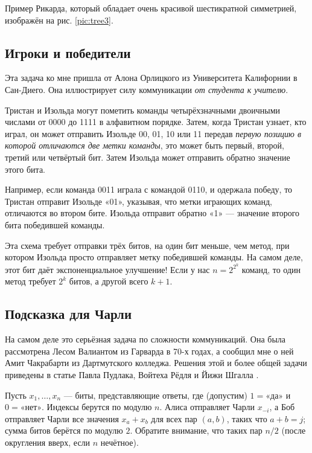 Пример Рикарда, который обладает очень красивой шестикратной симметрией, изображён на рис. \ref{pic:tree3}.

\subsection*{Игроки и победители}

Эта задача ко мне пришла от Алона Орлицкого из Университета Калифорнии в Сан-Диего.
Она иллюстрирует силу коммуникации \emph{от студента к учителю}.

Тристан и Изольда могут пометить команды четырёхзначными двоичными числами от 0000 до 1111 в алфавитном порядке. Затем, когда Тристан узнает, кто играл, он может отправить Изольде 00, 01, 10 или 11 передав \emph{первую позицию в которой отличаются две метки команды}, это может быть первый, второй, третий или четвёртый бит.
Затем Изольда может отправить обратно значение этого бита.

Например, если команда 0011 играла с командой 0110, и одержала победу,
то Тристан отправит Изольде «01», указывая, что метки играющих команд, отличаются во втором бите.
Изольда отправит обратно «1» --- значение второго бита победившей команды.

Эта схема требует отправки трёх битов, на один бит меньше, чем метод, при котором Изольда просто отправляет метку победившей команды.
На самом деле, этот бит даёт экспоненциальное улучшение!
Если у нас $n = 2^{2^k}$ команд, то один метод требует $2^k$ битов, а другой всего $k + 1$.



\subsection*{Подсказка для Чарли}

На самом деле это серьёзная задача по сложности коммуникаций.
Она была рассмотрена Лесом Валиантом из Гарварда в 70-х годах,
а сообщил мне о ней Амит Чакрабарти из Дартмутского колледжа.
Решения этой и более общей задачи приведены в статье Павла Пудлака, Войтеха Рёдля и Йижи Шгалла \cite{49}.

Пусть $x_1, \dots , x_n$ --- биты, представляющие ответы, где (допустим) $1 = \text{«да»}$ и $0 = \text{«нет»}$.
Индексы берутся по модулю $n$.
Алиса отправляет Чарли $x_{-i}$,
а Боб отправляет Чарли все значения $x_a + x_b$ для всех пар $(a, b)$, таких что $a + b = j$;
сумма битов берётся по модулю $2$.
Обратите внимание, что таких пар $n/2$ (после округления вверх, если $n$ нечётное).

